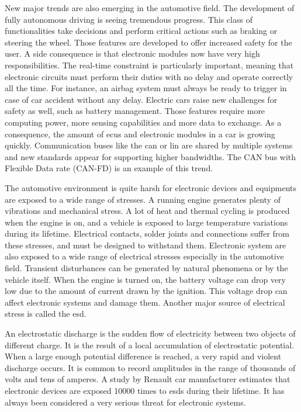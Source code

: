 New major trends are also emerging in the automotive field.
The development of fully autonomous driving is seeing tremendous progress.
This class of functionalities take decisions and perform critical actions such as braking or steering the wheel.
Those features are developed to offer increased safety for the user.
A side consequence is that electronic modules now have very high responsibilities.
The real-time constraint is particularly important, meaning that electronic circuits must perform their duties with no delay and operate correctly all the time.
For instance, an airbag system must always be ready to trigger in case of car accident without any delay.
Electric cars raise new challenges for safety as well, such as battery management.
Those features require more computing power, more sensing capabilities and more data to exchange.
As a consequence, the amount of \gls{ecu}s and electronic modules in a car is growing quickly.
Communication buses like the \gls{can} \cite{CAN} or \gls{lin} \cite{LIN} are shared by multiple systems and new standards appear for supporting higher bandwidths.
The CAN bus with Flexible Data rate (CAN-FD) is an example of this trend.

The automotive environment is quite harsh for electronic devices and equipments are exposed to a wide range of stresses.
A running engine generates plenty of vibrations and mechanical stress.
A lot of heat and thermal cycling is produced when the engine is on, and a vehicle is exposed to large temperature variations during its lifetime.
Electrical contacts, solder joints and connections suffer from these stresses, and must be designed to withstand them.
Electronic system are also exposed to a wide range of electrical stresses especially in the automotive field.
Transient disturbances can be generated by natural phenomena or by the vehicle itself.
When the engine is turned on, the battery voltage can drop very low due to the amount of current drawn by the ignition.
This voltage drop can affect electronic systems and damage them.
Another major source of electrical stress is called the \gls{esd}.

An electrostatic discharge is the sudden flow of electricity between two objects of different charge.
It is the result of a local accumulation of electrostatic potential.
When a large enough potential difference is reached, a very rapid and violent discharge occurs.
It is common to record amplitudes in the range of thousands of volts and tens of amperes.
A study by Renault car manufacturer \cite{Renault-esd} estimates that electronic devices are exposed 10000 times to \gls{esd}s during their lifetime.
It has always been considered a very serious threat for electronic systems.

